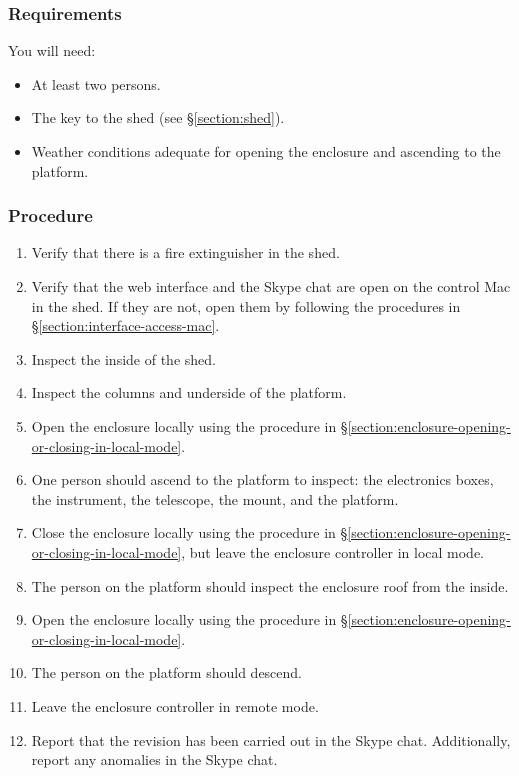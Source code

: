 
\subsubsection{Requirements}

You will need:
\begin{itemize}
\item At least two persons.
\item The key to the shed (see \S\ref{section:shed}).
\item Weather conditions adequate for opening the enclosure and ascending to the platform.
\end{itemize}

\subsubsection{Procedure}

\begin{enumerate}
\item
Verify that there is a fire extinguisher in the shed.
\item 
Verify that the web interface and the Skype chat are open on the control Mac in the shed. If they are not, open them by following the procedures in \S\ref{section:interface-access-mac}.
\item 
Inspect the inside of the shed. 
\item 
Inspect the columns and underside of the platform.
\item
Open the enclosure locally using the procedure in \S\ref{section:enclosure-opening-or-closing-in-local-mode}.
\item
One person should ascend to the platform to inspect: the electronics boxes, the instrument, the telescope, the mount, and the platform.
\item
Close the enclosure locally using the procedure in \S\ref{section:enclosure-opening-or-closing-in-local-mode}, but leave the enclosure controller in local mode.
\item
The person on the platform should inspect the enclosure roof from the inside.
\item
Open the enclosure locally using the procedure in \S\ref{section:enclosure-opening-or-closing-in-local-mode}.
\item
The person on the platform should descend.
\item
Leave the enclosure controller in remote mode.
\item
Report that the revision has been carried out in the Skype chat. Additionally, report any anomalies in the Skype chat.
\end{enumerate}

